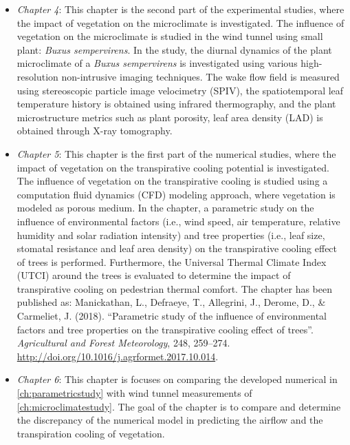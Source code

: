 \begin{itemize}
	\item \textit{Chapter 4}: This chapter is the second part of the experimental studies, where the impact of vegetation on the microclimate is investigated. The influence of vegetation on the microclimate is studied in the wind tunnel using small plant: \textit{Buxus sempervirens}. In the study, the diurnal dynamics of the plant microclimate of a \textit{Buxus sempervirens} is investigated using various high-resolution non-intrusive imaging techniques. The wake flow field is measured using stereoscopic particle image velocimetry (SPIV), the spatiotemporal leaf temperature history is obtained using infrared thermography, and the plant microstructure metrics such as plant porosity, leaf area density (LAD) is obtained through X-ray tomography. %
	
	\item \textit{Chapter 5}: This chapter is the first part of the numerical studies, where the impact of vegetation on the transpirative cooling potential is investigated. The influence of vegetation on the transpirative cooling is studied using a computation fluid dynamics (CFD) modeling approach, where vegetation is modeled as porous medium. In the chapter, a parametric study on the influence of environmental factors (i.e., wind speed, air temperature, relative humidity and solar radiation intensity) and tree properties (i.e., leaf size, stomatal resistance and leaf area density) on the transpirative cooling effect of trees is performed. Furthermore, the Universal Thermal Climate Index (UTCI) around the trees is evaluated to determine the impact of transpirative cooling on pedestrian thermal comfort. The chapter has been published as: Manickathan, L., Defraeye, T., Allegrini, J., Derome, D., \& Carmeliet, J. (2018). ``Parametric study of the influence of environmental factors and tree properties on the transpirative cooling effect of trees''. \textit{Agricultural and Forest Meteorology}, 248, 259–274. \url{http://doi.org/10.1016/j.agrformet.2017.10.014}.%
	
	\item \textit{Chapter 6}: This chapter is focuses on comparing the developed numerical in \cref{ch:parametricstudy} with wind tunnel measurements of \cref{ch:microclimatestudy}. The goal of the chapter is to compare and determine the discrepancy of the numerical model in predicting the airflow and the transpiration cooling of vegetation. 
	

\end{itemize}

